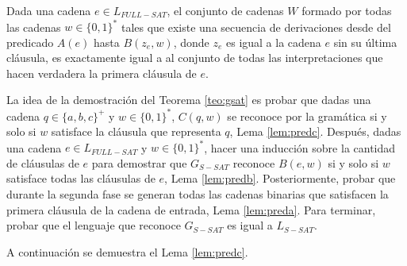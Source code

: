 \begin{lemma}
    \label{lem:preda}
    Dada una cadena $e\in L_{FULL-SAT}$, el conjunto de cadenas $W$ formado por todas las cadenas $w\in \{0,1\}^*$ tales que existe una secuencia de derivaciones desde del 
    predicado $A(e)$ hasta $B(z_e,w)$, donde $z_e$ es igual a la cadena $e$ sin su última cláusula, es exactamente igual a al conjunto de todas las interpretaciones que hacen 
    verdadera la primera cláusula de $e$. 
\end{lemma}

La idea de la demostración del Teorema \ref{teo:gsat} es probar que dadas una cadena $q\in \{a,b,c\}^+$ y $w\in \{0,1\}^*$, $C(q,w)$ se reconoce por la gramática si y solo si 
$w$ satisface la cláusula que representa $q$, Lema \ref{lem:predc}. Después, dadas una cadena $e\in L_{FULL-SAT}$ y $w\in \{0,1\}^*$, hacer una inducción sobre la cantidad de cláusulas
de $e$ para demostrar que $G_{S-SAT}$ reconoce $B(e,w)$
si y solo si $w$ satisface todas las cláusulas de $e$, Lema \ref{lem:predb}. Posteriormente, probar que durante la segunda fase se generan todas las cadenas binarias que satisfacen 
la primera cláusula de la cadena de entrada, Lema \ref{lem:preda}. Para terminar, probar que el lenguaje que reconoce $G_{S-SAT}$ es igual a $L_{S-SAT}$.

A continuación se demuestra el Lema \ref{lem:predc}.

